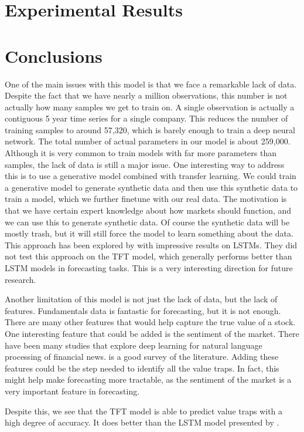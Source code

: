 \documentclass[AER]{AEA}
\begin{document}
\section{Experimental Results}
\section{Conclusions}
One of the main issues with this model is that we face a remarkable lack of data.
Despite the fact that we have nearly a million observations, this number is not actually how many samples we get to train on.
A single observation is actually a contiguous 5 year time series for a single company. 
This reduces the number of training samples to around 57,320, which is barely enough to train a deep neural network.
The total number of actual parameters in our model is about 259,000. 
Although it is very common to train models with far more parameters than samples, the lack of data is still a major issue.
One interesting way to address this is to use a generative model combined with transfer learning.
We could train a generative model to generate synthetic data and then use this synthetic data to train a model, which we further finetune with our real data.
The motivation is that we have certain expert knowledge about how markets should function, and we can use this to generate synthetic data.
Of course the synthetic data will be mostly trash, but it will still force the model to learn something about the data.
This approach has been explored by \cite{dataAug} with impressive results on LSTMs. 
They did not test this approach on the TFT model, which generally performs better than LSTM models in forecasting tasks.
This is a very interesting direction for future research.

Another limitation of this model is not just the lack of data, but the lack of features. 
Fundamentals data is fantastic for forecasting, but it is not enough. 
There are many other features that would help capture the true value of a stock.
One interesting feature that could be added is the sentiment of the market. 
There have been many studies that explore deep learning for natural language processing of financial news.
\cite{sentimentAnalysis} is a good survey of the literature.
Adding these features could be the step needed to identify all the value traps. 
In fact, this might help make forecasting more tractable, as the sentiment of the market is a very important feature in forecasting.

Despite this, we see that the TFT model is able to predict value traps with a high degree of accuracy. 
It does better than the LSTM model presented by \cite{euclidean}. 



\end{document}
